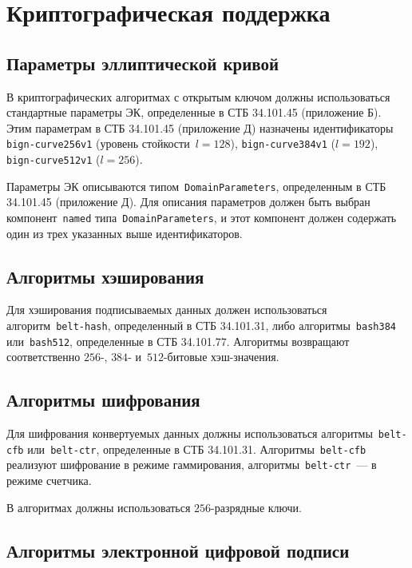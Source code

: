 \chapter{Криптографическая поддержка}\label{CRYPTO}

\section{Параметры эллиптической кривой}\label{CRYPTO.Params}

В криптографических алгоритмах с открытым ключом должны
использоваться стандартные параметры ЭК, 
определенные в СТБ 34.101.45 (приложение Б). Этим параметрам в СТБ 
34.101.45 (приложение Д) назначены идентификаторы 
\texttt{bign-curve256v1} (уровень стойкости~$l=128$), 
\texttt{bign-curve384v1} ($l=192$), \texttt{bign-curve512v1} ($l=256$).

Параметры ЭК описываются типом~\texttt{DomainParameters},
определенным в СТБ 34.101.45  (приложение Д). Для описания параметров
должен быть выбран компонент~\texttt{named} типа~\texttt{DomainParameters},
и этот компонент должен содержать один из трех указанных выше
идентификаторов.

\section{Алгоритмы хэширования}\label{CRYPTO.Hash}

Для хэширования подписываемых данных должен использоваться 
алгоритм~\texttt{belt-hash}, определенный в СТБ 34.101.31, либо 
алгоритмы~\texttt{bash384} или~\texttt{bash512}, определенные в СТБ 
34.101.77. Алгоритмы возвращают соответственно $256$-, $384$- 
и~$512$-битовые хэш-значения.

\section{Алгоритмы шифрования}\label{CRYPTO.Encr}

Для шифрования конвертуемых данных должны использоваться 
алгоритмы~\texttt{belt-cfb} или~\texttt{belt-ctr}, определенные в СТБ 
34.101.31. Алгоритмы~\texttt{belt-cfb} реализуют шифрование в режиме 
гаммирования, алгоритмы~\texttt{belt-ctr}~--- в режиме счетчика.

В алгоритмах должны использоваться $256$-разрядные ключи.

\section{Алгоритмы электронной цифровой подписи}\label{CRYPTO.Sign}

